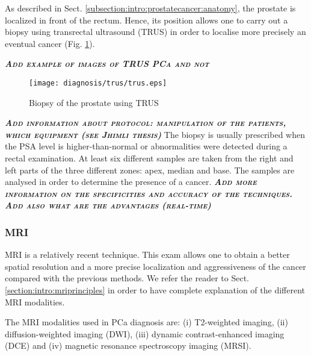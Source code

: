 As described in Sect. \ref{subsection:intro:prostatecancer:anatomy}, the prostate is localized in front of the rectum. Hence, its position allows one to carry out a biopsy using transrectal ultrasound (TRUS) in order to localise more precisely an eventual cancer (Fig. \ref{fig:intro:prostatecancer:diagnosis:trus}).

\textbf{\textit{\textsc{Add example of images of TRUS PCa and not}}}
\begin{figure}
	\centering
	\texttt{[image: diagnosis/trus/trus.eps]}
	\caption{Biopsy of the prostate using TRUS}
	\label{fig:intro:prostatecancer:diagnosis:trus}
\end{figure}

\textbf{\textit{\textsc{Add information about protocol: manipulation of the patients, which equipment (see Jhimli thesis)}}}
The biopsy is usually prescribed when the PSA level is higher-than-normal or abnormalities were detected during a rectal examination. At least six different samples are taken from the right and left parts of the three different zones: apex, median and base. The samples are analysed in order to determine the presence of a cancer.
\textbf{\textit{\textsc{Add more information on the specificities and accuracy of the techniques. Add also what are the advantages (real-time)}}}

\subsubsection{MRI}\label{subsubsection:intro:prostatecancer:diagnosis:mri}

MRI is a relatively recent technique. This exam allows one to obtain a better spatial resolution and a more precise localization and aggressiveness of the cancer compared with the previous methods. We refer the reader to Sect. \ref{section:intro:mriprinciples} in order to have complete explanation of the different MRI modalities.

The MRI modalities used in PCa diagnosis are: (i) T2-weighted imaging, (ii) diffusion-weighted imaging (DWI\g), (iii) dynamic contrast-enhanced imaging (DCE\g) and (iv) magnetic resonance spectroscopy imaging (MRSI\g).


